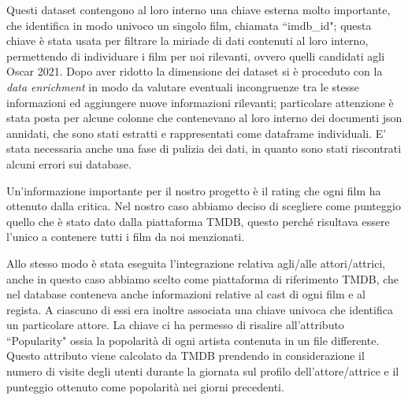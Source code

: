 \documentclass[11pt,a4paper]{report}
\begin{document}
Questi dataset contengono al loro interno una chiave esterna molto importante, che identifica in modo univoco un singolo film, chiamata “imdb\_id"; questa chiave è stata usata per filtrare la miriade di dati contenuti al loro interno, permettendo di individuare i film per noi rilevanti, ovvero quelli candidati agli Oscar 2021. Dopo aver ridotto la dimensione dei dataset si è proceduto con la \textit{data enrichment} in modo da valutare eventuali incongruenze tra le stesse informazioni ed aggiungere nuove informazioni rilevanti; particolare attenzione è stata posta per alcune colonne che contenevano al loro interno dei documenti json annidati, che sono stati estratti e rappresentati come dataframe individuali. E' stata necessaria anche una fase di pulizia dei dati, in quanto sono stati riscontrati alcuni errori sui database.

Un'informazione importante per il nostro progetto è il rating che ogni film ha ottenuto dalla critica. Nel nostro caso abbiamo deciso di scegliere come punteggio quello che è stato dato dalla piattaforma TMDB, questo perché risultava essere l'unico a contenere tutti i film da noi menzionati.

Allo stesso modo è stata eseguita l'integrazione relativa agli/alle attori/attrici, anche in questo caso abbiamo scelto come piattaforma di riferimento TMDB, che nel database conteneva anche informazioni relative al cast di ogni film e al regista. A ciascuno di essi era inoltre associata una chiave univoca che identifica un particolare attore. La chiave ci ha permesso di risalire all'attributo “Popularity" ossia la popolarità di ogni artista contenuta in un file differente. Questo attributo viene calcolato da TMDB prendendo in considerazione il numero di visite degli utenti durante la giornata sul profilo dell'attore/attrice e il punteggio ottenuto come popolarità nei giorni precedenti.
\end{document}
